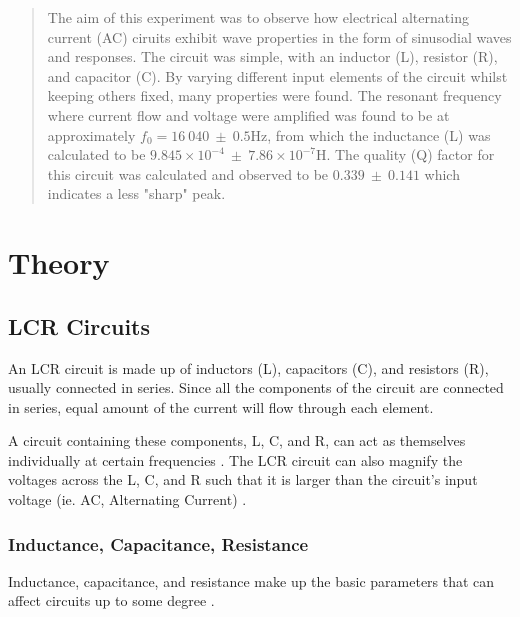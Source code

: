 \documentclass[12pt]{article}
\begin{document}
\begin{abstract}

The aim of this experiment was to observe how electrical alternating current (AC) ciruits exhibit wave properties in the form of sinusodial waves and responses.
The circuit was simple, with an inductor (L), resistor (R), and capacitor (C). By varying different input elements of the circuit whilst keeping others fixed, many properties were found.
The resonant frequency where current flow and voltage were amplified was found to be at approximately $f_0 = 16 \: 040 \: \pm \: 0.5$Hz, from which the inductance (L) was calculated
to be $9.845 \times 10^{-4} \: \pm \: 7.86 \times 10^{-7}$H. The quality (Q) factor for this circuit was calculated and observed to be $0.339 \: \pm \: 0.141$ which indicates a less "sharp" peak.

\end{abstract}


\vspace{2.5cm}

\section{Theory}

\subsection{LCR Circuits} \label{sec:1.1}
An LCR circuit is made up of inductors (L), capacitors (C), and resistors (R), usually connected in series.
Since all the components of the circuit are connected in series, equal amount of the current will flow through each element.
\cite{unacademy}

A circuit containing these components, L, C, and R, can act as themselves individually at certain frequencies
\cite{learnabout}.
The LCR circuit can also magnify the voltages across the L, C, and R such that it is larger than the  circuit's input voltage (ie. AC, Alternating Current)
\cite{learnabout}.

\subsubsection{Inductance, Capacitance, Resistance} \label{sec:1.1.1}

Inductance, capacitance, and resistance make up the basic parameters that can affect circuits up to some degree
\cite{elecnotes}.
\end{document}

